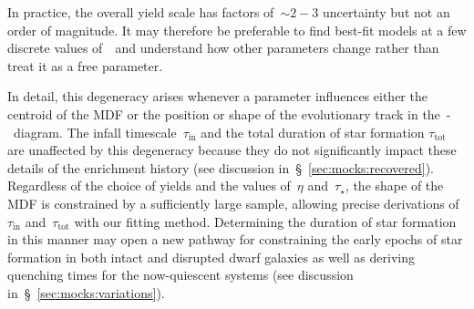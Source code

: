 \documentclass[foo.tex]{subfiles}
\begin{document}
In practice, the overall yield scale has factors of~$\sim$$2 - 3$ uncertainty
but not an order of magnitude.
It may therefore be preferable to find best-fit models at a few discrete
values of~\yacc~and understand how other parameters change rather than treat
it as a free parameter.
\par
In detail, this degeneracy arises whenever a parameter influences either the
centroid of the MDF or the position or shape of the evolutionary track in
the~\afe-\feh~diagram.
The infall timescale~$\tau_\text{in}$ and the total duration of star formation
$\tau_\text{tot}$ are unaffected by this degeneracy because they do not
significantly impact these details of the enrichment history (see discussion
in~\S~\ref{sec:mocks:recovered}).
Regardless of the choice of yields and the values of~$\eta$ and~$\tau_\star$,
the shape of the MDF is constrained by a sufficiently large sample, allowing
precise derivations of~$\tau_\text{in}$ and~$\tau_\text{tot}$ with our fitting
method.
Determining the duration of star formation in this manner may open a new
pathway for constraining the early epochs of star formation in both intact
and disrupted dwarf galaxies as well as deriving quenching times for the
now-quiescent systems (see discussion in~\S~\ref{sec:mocks:variations}).
\end{document}
